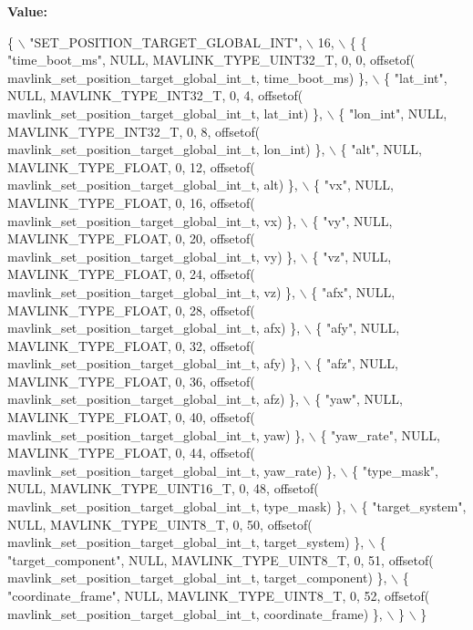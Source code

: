 {\bfseries Value\+:}
\begin{DoxyCode}
\{ \(\backslash\)
    \textcolor{stringliteral}{"SET\_POSITION\_TARGET\_GLOBAL\_INT"}, \(\backslash\)
    16, \(\backslash\)
    \{  \{ \textcolor{stringliteral}{"time\_boot\_ms"}, NULL, MAVLINK_TYPE_UINT32_T, 0, 0, offsetof(
      mavlink_set_position_target_global_int_t, time\_boot\_ms) \}, \(\backslash\)
         \{ \textcolor{stringliteral}{"lat\_int"}, NULL, MAVLINK_TYPE_INT32_T, 0, 4, offsetof(
      mavlink_set_position_target_global_int_t, lat\_int) \}, \(\backslash\)
         \{ \textcolor{stringliteral}{"lon\_int"}, NULL, MAVLINK_TYPE_INT32_T, 0, 8, offsetof(
      mavlink_set_position_target_global_int_t, lon\_int) \}, \(\backslash\)
         \{ \textcolor{stringliteral}{"alt"}, NULL, MAVLINK_TYPE_FLOAT, 0, 12, offsetof(
      mavlink_set_position_target_global_int_t, alt) \}, \(\backslash\)
         \{ \textcolor{stringliteral}{"vx"}, NULL, MAVLINK_TYPE_FLOAT, 0, 16, offsetof(
      mavlink_set_position_target_global_int_t, vx) \}, \(\backslash\)
         \{ \textcolor{stringliteral}{"vy"}, NULL, MAVLINK_TYPE_FLOAT, 0, 20, offsetof(
      mavlink_set_position_target_global_int_t, vy) \}, \(\backslash\)
         \{ \textcolor{stringliteral}{"vz"}, NULL, MAVLINK_TYPE_FLOAT, 0, 24, offsetof(
      mavlink_set_position_target_global_int_t, vz) \}, \(\backslash\)
         \{ \textcolor{stringliteral}{"afx"}, NULL, MAVLINK_TYPE_FLOAT, 0, 28, offsetof(
      mavlink_set_position_target_global_int_t, afx) \}, \(\backslash\)
         \{ \textcolor{stringliteral}{"afy"}, NULL, MAVLINK_TYPE_FLOAT, 0, 32, offsetof(
      mavlink_set_position_target_global_int_t, afy) \}, \(\backslash\)
         \{ \textcolor{stringliteral}{"afz"}, NULL, MAVLINK_TYPE_FLOAT, 0, 36, offsetof(
      mavlink_set_position_target_global_int_t, afz) \}, \(\backslash\)
         \{ \textcolor{stringliteral}{"yaw"}, NULL, MAVLINK_TYPE_FLOAT, 0, 40, offsetof(
      mavlink_set_position_target_global_int_t, yaw) \}, \(\backslash\)
         \{ \textcolor{stringliteral}{"yaw\_rate"}, NULL, MAVLINK_TYPE_FLOAT, 0, 44, offsetof(
      mavlink_set_position_target_global_int_t, yaw\_rate) \}, \(\backslash\)
         \{ \textcolor{stringliteral}{"type\_mask"}, NULL, MAVLINK_TYPE_UINT16_T, 0, 48, offsetof(
      mavlink_set_position_target_global_int_t, type\_mask) \}, \(\backslash\)
         \{ \textcolor{stringliteral}{"target\_system"}, NULL, MAVLINK_TYPE_UINT8_T, 0, 50, offsetof(
      mavlink_set_position_target_global_int_t, target\_system) \}, \(\backslash\)
         \{ \textcolor{stringliteral}{"target\_component"}, NULL, MAVLINK_TYPE_UINT8_T, 0, 51, offsetof(
      mavlink_set_position_target_global_int_t, target\_component) \}, \(\backslash\)
         \{ \textcolor{stringliteral}{"coordinate\_frame"}, NULL, MAVLINK_TYPE_UINT8_T, 0, 52, offsetof(
      mavlink_set_position_target_global_int_t, coordinate\_frame) \}, \(\backslash\)
         \} \(\backslash\)
\}
\end{DoxyCode}
